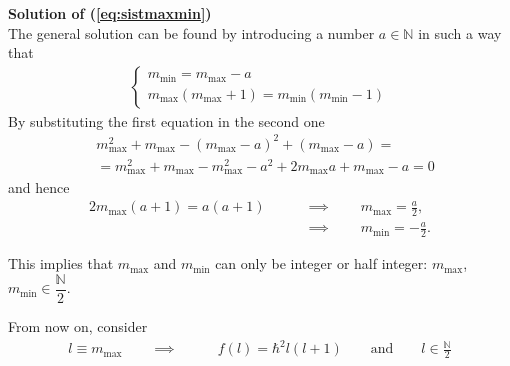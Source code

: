\begin{itemize}
\begin{tcolorbox}
\textbf{Solution of (\ref{eq:sistmaxmin})} \\
The general solution can be found by introducing a number $a \in \mathbb{N}$ in such a way that
    \begin{align*}
        \begin{cases}
        m_\text{min} = m_\text{max} - a \\
        m_\text{max} (m_\text{max} + 1) = m_\text{min} (m_\text{min} - 1) 
    \end{cases}
    \end{align*}
    By substituting the first equation in the second one
    \begin{align*}
    & m_\text{max}^2 + m_\text{max} - (m_\text{max} - a)^2 + (m_\text{max} - a) = \\
    & = m_\text{max}^2 + m_\text{max} - m_\text{max}^2 -a^2 +2 m_\text{max}a + m_\text{max} - a = 0 
    \end{align*}
    and hence 
    \begin{align*}
         2m_\text {max}(a+1) = a(a+1) \qquad & \implies \qquad  m_\text{max} = \frac{a}{2}, \\
         & \implies \qquad m_\text{min} = -\frac{a}{2}.
    \end{align*}
\end{tcolorbox}
This implies that $m_\text{max}$ and $m_\text{min}$ can only be integer or half integer: $m_\text{max}$, $m_\text{min} \in \dfrac{\mathbb{N}}{2}$.

From now on, consider 
\begin{align*}
    l \equiv m_\text{max} \qquad \implies \qquad & f(l) = \hbar^2 l(l+1) \qquad \text{and} \qquad l \in \frac{\mathbb{N}}{2}
\end{align*}
    

\end{itemize}
